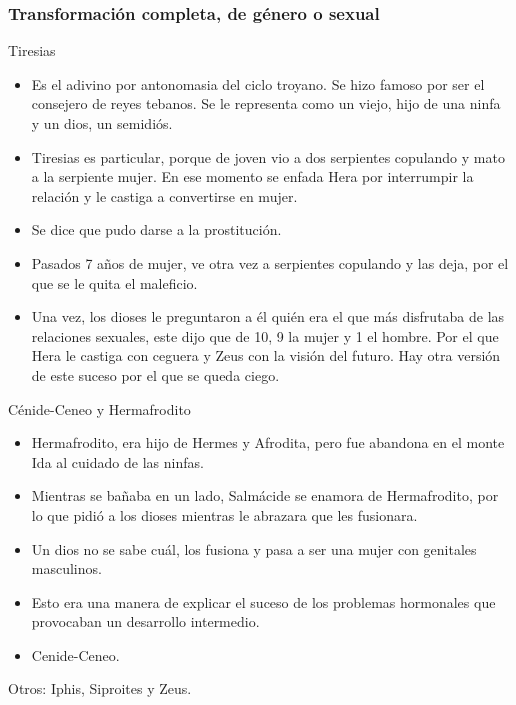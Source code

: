 \subsubsection{Transformación completa, de género o sexual}
Tiresias
\begin{itemize}
    \item Es el adivino por antonomasia del ciclo troyano. Se hizo famoso por ser el consejero de reyes tebanos. Se le representa como un viejo, hijo de una ninfa y un dios, un semidiós.
    \item Tiresias es particular, porque de joven vio a dos serpientes copulando y mato a la serpiente mujer. En ese momento se enfada Hera por interrumpir la relación y le castiga a convertirse en mujer.
    \item Se dice que pudo darse a la prostitución.
    \item Pasados 7 años de mujer, ve otra vez a serpientes copulando y las deja, por el que se le quita el maleficio.
    \item Una vez, los dioses le preguntaron a él quién era el que más disfrutaba de las relaciones sexuales, este dijo que de 10, 9 la mujer y 1 el hombre. Por el que Hera le castiga con ceguera y Zeus con la visión del futuro. Hay otra versión de este suceso por el que se queda ciego.
\end{itemize}

Cénide-Ceneo y Hermafrodito
\begin{itemize}
    \item Hermafrodito, era hijo de Hermes y Afrodita, pero fue abandona en el monte Ida al cuidado de las ninfas.
    \item Mientras se bañaba en un lado, Salmácide se enamora de Hermafrodito, por lo que pidió a los dioses mientras le abrazara que les fusionara.
    \item Un dios no se sabe cuál, los fusiona y pasa a ser una mujer con genitales masculinos.
    \item Esto era una manera de explicar el suceso de los problemas hormonales que provocaban un desarrollo intermedio.
    \item Cenide-Ceneo.
\end{itemize}

Otros: Iphis, Siproites y Zeus.